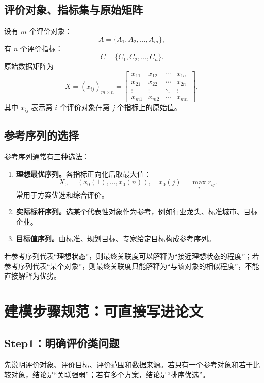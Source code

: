\documentclass[UTF8,a4paper,11pt]{ctexart}
\begin{document}
\subsection{评价对象、指标集与原始矩阵}
设有 $m$ 个评价对象：
\[
A=\{A_1,A_2,\ldots,A_m\},
\]
有 $n$ 个评价指标：
\[
C=\{C_1,C_2,\ldots,C_n\}.
\]
原始数据矩阵为
\[
X=(x_{ij})_{m\times n}=\begin{bmatrix}
x_{11}&x_{12}&\cdots&x_{1n}\\
x_{21}&x_{22}&\cdots&x_{2n}\\
\vdots&\vdots&\ddots&\vdots\\
x_{m1}&x_{m2}&\cdots&x_{mn}
\end{bmatrix},
\]
其中 $x_{ij}$ 表示第 $i$ 个评价对象在第 $j$ 个指标上的原始值。

\subsection{参考序列的选择}
参考序列通常有三种选法：
\begin{enumerate}[label=\arabic*)]
  \item \textbf{理想最优序列。}各指标正向化后取最大值：
  \[
  X_0=(x_0(1),\ldots,x_0(n)),\quad x_0(j)=\max_i r_{ij}.
  \]
  常用于方案优选和综合评价。
  \item \textbf{实际标杆序列。}选某个代表性对象作为参考，例如行业龙头、标准城市、目标企业。
  \item \textbf{目标值序列。}由标准、规划目标、专家给定目标构成参考序列。
\end{enumerate}

\begin{warnbox}[参考序列不要随意选]
若参考序列代表“理想状态”，则最终关联度可以解释为“接近理想状态的程度”；若参考序列代表“某个对象”，则最终关联度只能解释为“与该对象的相似程度”，不能直接解释为优劣。
\end{warnbox}

\section{建模步骤规范：可直接写进论文}
\subsection{Step1：明确评价类问题}
先说明评价对象、评价目标、评价范围和数据来源。若只有一个参考对象和若干比较对象，结论是“关联强弱”；若有多个方案，结论是“排序优选”。
\end{document}
